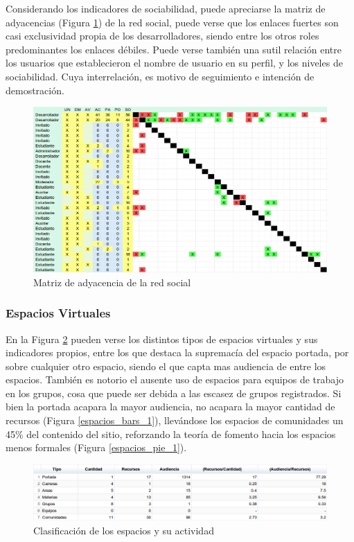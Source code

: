 Considerando los indicadores de sociabilidad, puede apreciarse la matriz de adyacencias (Figura \ref{contactos_matriz}) de la
red social, puede verse que los enlaces fuertes son casi exclusividad propia de los desarrolladores, siendo entre
los otros roles predominantes los enlaces d\'ebiles. Puede verse tambi\'en una sutil relaci\'on entre los usuarios que 
establecieron el nombre de usuario en su perfil, y los niveles de sociabilidad. Cuya interrelaci\'on, es motivo
de seguimiento e intenci\'on de demostraci\'on.
\begin{figure}[H]
\centering
    \includegraphics[scale=0.4]{graphics/contactos_matriz.png}
    \caption {Matriz de adyacencia de la red social}
    \label {contactos_matriz}
\end{figure}

\subsubsection{Espacios Virtuales}

En la Figura \ref{espacios_tabla_1} pueden verse los distintos tipos de espacios virtuales y sus indicadores propios, entre 
los que destaca la supremac\'ia del espacio portada, por sobre cualquier otro espacio, siendo el que 
capta mas audiencia de entre los espacios. Tambi\'en es notorio el ausente uso de espacios para equipos de trabajo en los 
grupos, cosa que puede ser debida a las escasez de grupos registrados. Si bien la portada acapara la 
mayor audiencia, no acapara la mayor cantidad de recursos (Figura \ref{espacios_bars_1}), llev\'andose los espacios de 
comunidades un 45\% del contenido del sitio, reforzando la teor\'ia de fomento hacia los espacios menos 
formales (Figura \ref{espacios_pie_1}).
\begin{figure}[H]
\centering
    \includegraphics[scale=0.4]{graphics/espacios_tabla_1.png}
    \caption {Clasificaci\'on de los espacios y su actividad}
    \label {espacios_tabla_1}
\end{figure}

